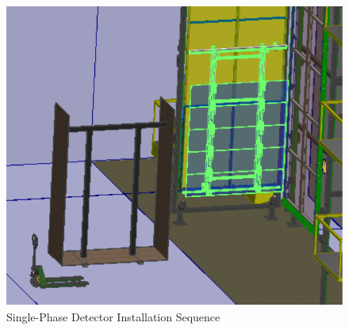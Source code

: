 \begin{figure}
\begin{center}
\begin{minipage}[c]{0.32\textwidth}
\end{minipage}
\begin{minipage}[c]{0.32\textwidth}
\includegraphics[width=\textwidth]{far-detector-single-phase/figures/CPA-3.pdf}
\end{minipage}

\caption{Single-Phase Detector Installation Sequence}
\label{fig:Install-Seq3}
\end{center}
\end{figure}

